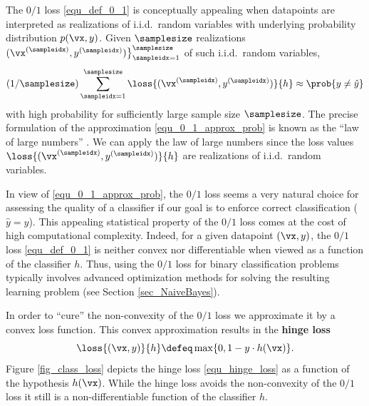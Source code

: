 \documentclass[12pt]{report}
\begin{document}
The $0/1$ loss \eqref{equ_def_0_1} is conceptually appealing when 
datapoints are interpreted as realizations of i.i.d.\ random variables 
with underlying probability distribution $p(\vx,y)$. Given 
$\samplesize$ realizations $(\vx^{(\sampleidx)},y^{(\sampleidx)}) \big\}_{\sampleidx=1}^{\samplesize}$ 
of such i.i.d.\ random variables,
\begin{equation} 
\label{equ_0_1_approx_prob}
(1/\samplesize) \sum_{\sampleidx=1}^{\samplesize} \loss{(\vx^{(\sampleidx)},y^{(\sampleidx)})}{h} \approx \prob{ y \neq \hat{y} }
\end{equation} 
with high probability for sufficiently large sample size $\samplesize$. 
The precise formulation of the approximation \eqref{equ_0_1_approx_prob} 
is known as the ``law of large numbers'' \cite[Section 1]{BillingsleyProbMeasure}. 
We can apply the law of large numbers since the loss values $\loss{(\vx^{(\sampleidx)},y^{(\sampleidx)})}{h}$ 
are realizations of i.i.d.\ random variables. 

In view of \eqref{equ_0_1_approx_prob}, the $0/1$ loss seems 
a very natural choice for assessing the quality of a classifier 
if our goal is to enforce correct classification ($\hat{y}=y$). 
This appealing statistical property of the $0/1$ loss comes 
at the cost of high computational complexity. Indeed, for a 
given datapoint $(\vx,y)$, the $0/1$ loss \eqref{equ_def_0_1} 
is neither convex nor differentiable when viewed as a function 
of the classifier $h$. Thus, using the $0/1$ loss for binary 
classification problems typically involves advanced optimization 
methods for solving the resulting learning problem (see Section \ref{sec_NaiveBayes}). 

In order to ``cure'' the non-convexity of the $0/1$ loss we 
approximate it by a convex loss function. This convex 
approximation results in the {\bf hinge loss}
\begin{equation} 
\label{equ_hinge_loss}
\loss{(\vx,y)}{h} \defeq \max \{ 0 , 1 - y\cdot h(\vx) \}. 
\end{equation}
Figure \ref{fig_class_loss} depicts the hinge loss \eqref{equ_hinge_loss} 
as a function of the hypothesis $h(\vx)$. 
While the hinge loss avoids the non-convexity of the $0/1$ 
loss it still is a non-differentiable function of the classifier $h$. 
\end{document}
